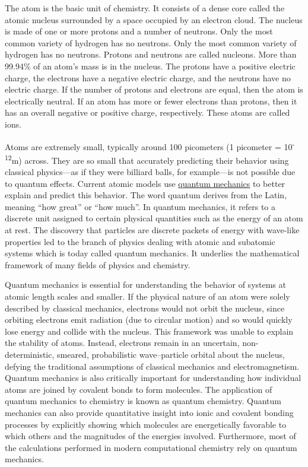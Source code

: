 The atom is the basic unit of chemistry. It consists of a dense core called the atomic nucleus surrounded by a space occupied by an electron cloud. The nucleus is made of one or more protons and a number of neutrons. Only the most common variety of hydrogen has no neutrons. Only the most common variety of hydrogen has no neutrons. Protons and neutrons are called nucleons. More than 99.94\% of an atom's mass is in the nucleus. The protons have a positive electric charge, the electrons have a negative electric charge, and the neutrons have no electric charge. If the number of protons and electrons are equal, then the atom is electrically neutral. If an atom has more or fewer electrons than protons, then it has an overall negative or positive charge, respectively. These atoms are called ions.

Atoms are extremely small, typically around 100 picometers (1 picometer = 10\textsuperscript{-12}m) across. They are so small that accurately predicting their behavior using classical physics---as if they were billiard balls, for example---is not possible due to quantum effects. Current atomic models use \href{https://en.wikipedia.org/wiki/Quantum_mechanics}{quantum mechanics} to better explain and predict this behavior. The word quantum derives from the Latin, meaning ``how great'' or ``how much''. In quantum mechanics, it refers to a discrete unit assigned to certain physical quantities such as the energy of an atom at rest. The discovery that particles are discrete packets of energy with wave-like properties led to the branch of physics dealing with atomic and subatomic systems which is today called quantum mechanics. It underlies the mathematical framework of many fields of physics and chemistry.

Quantum mechanics is essential for understanding the behavior of systems at atomic length scales and smaller. If the physical nature of an atom were solely described by classical mechanics, electrons would not orbit the nucleus, since orbiting electrons emit radiation (due to circular motion) and so would quickly lose energy and collide with the nucleus. This framework was unable to explain the stability of atoms. Instead, electrons remain in an uncertain, non-deterministic, smeared, probabilistic wave--particle orbital about the nucleus, defying the traditional assumptions of classical mechanics and electromagnetism.
Quantum mechanics is also critically important for understanding how individual atoms are joined by covalent bonds to form molecules. The application of quantum mechanics to chemistry is known as quantum chemistry. Quantum mechanics can also provide quantitative insight into ionic and covalent bonding processes by explicitly showing which molecules are energetically favorable to which others and the magnitudes of the energies involved. Furthermore, most of the calculations performed in modern computational chemistry rely on quantum mechanics.



